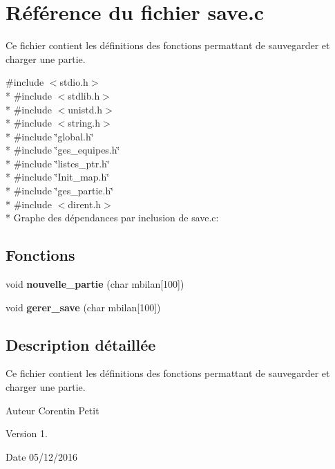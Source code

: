 \hypertarget{a00010}{}\section{Référence du fichier save.\+c}
\label{a00010}


Ce fichier contient les définitions des fonctions permattant de sauvegarder et charger une partie.  


{\ttfamily \#include $<$stdio.\+h$>$}\\*
{\ttfamily \#include $<$stdlib.\+h$>$}\\*
{\ttfamily \#include $<$unistd.\+h$>$}\\*
{\ttfamily \#include $<$string.\+h$>$}\\*
{\ttfamily \#include \char`\"{}global.\+h\char`\"{}}\\*
{\ttfamily \#include \char`\"{}ges\+\_\+equipes.\+h\char`\"{}}\\*
{\ttfamily \#include \char`\"{}listes\+\_\+ptr.\+h\char`\"{}}\\*
{\ttfamily \#include \char`\"{}Init\+\_\+map.\+h\char`\"{}}\\*
{\ttfamily \#include \char`\"{}ges\+\_\+partie.\+h\char`\"{}}\\*
{\ttfamily \#include $<$dirent.\+h$>$}\\*
Graphe des dépendances par inclusion de save.\+c\+:
\subsection*{Fonctions}
\begin{DoxyCompactItemize}
\item 
void {\bfseries nouvelle\+\_\+partie} (char mbilan\mbox{[}100\mbox{]})\hypertarget{a00010_a9081f16cfa0bd92678bdcffad6456630}{}\label{a00010_a9081f16cfa0bd92678bdcffad6456630}

\item 
void {\bfseries gerer\+\_\+save} (char mbilan\mbox{[}100\mbox{]})\hypertarget{a00010_ad2efcf23a5a818ea578447b2e2997315}{}\label{a00010_ad2efcf23a5a818ea578447b2e2997315}

\end{DoxyCompactItemize}


\subsection{Description détaillée}
Ce fichier contient les définitions des fonctions permattant de sauvegarder et charger une partie. 

\begin{DoxyAuthor}{Auteur}
Corentin Petit 
\end{DoxyAuthor}
\begin{DoxyVersion}{Version}
1. 
\end{DoxyVersion}
\begin{DoxyDate}{Date}
05/12/2016 
\end{DoxyDate}
